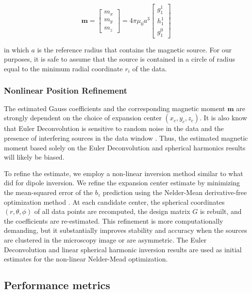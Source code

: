 \begin{equation}
\mathbf{m} = 
\begin{bmatrix}
    m_x \\ m_y \\ m_z
\end{bmatrix} = 4\pi \mu_0 a^3
\begin{bmatrix}
    g_1^1 \\ h_1^1 \\ g_1^0
\end{bmatrix}
\end{equation}

\noindent
in which $a$ is the reference radius that contains the magnetic source. For our purposes, it is safe to assume that the source is contained in a circle of radius equal to the minimum radial coordinate $r_i$ of the data.


\subsubsection{Nonlinear Position Refinement}\label{nonlinear-inversion}

The estimated Gauss coefficients and the corresponding magnetic moment $\mathbf{m}$ are strongly dependent on the choice of expansion center $(x_c, y_c, z_c)$. 
It is also know that Euler Deconvolution is sensitive to random noise in the data and the presence of interfering sources in the data window \citep{Uieda2025,Silva2001}.
Thus, the estimated magnetic moment based solely on the Euler Deconvolution and spherical harmonics results will likely be biased.

To refine the estimate, we employ a non-linear inversion method similar to what \citet{SouzaJunior2026} did for dipole inversion.
We refine the expansion center estimate by minimizing the mean-squared error of the $b_z$ prediction using the Nelder-Mean derivative-free optimization method \citep{Nelder-Mead1965, 2020SciPy-NMeth}. At each candidate center, the spherical coordinates $(r,\theta,\phi)$ of all data points are recomputed, the design matrix $G$ is rebuilt, and the coefficients are re-estimated. This refinement is more computationally demanding, but it substantially improves stability and accuracy when the sources are clustered in the microscopy image or are asymmetric. The Euler Deconvolution and linear spherical harmonic inversion results are used as initial estimates for the non-linear Nelder-Mead optimization.


\subsection{Performance metrics}\label{metrics}

